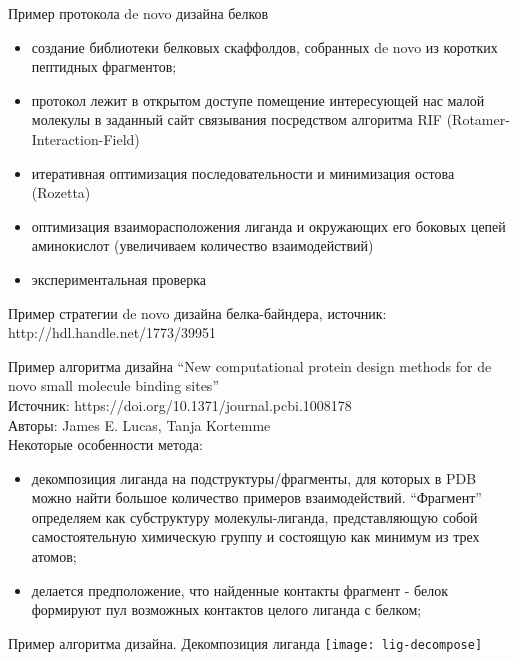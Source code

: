 \begin{frame}{Пример протокола de novo дизайна белков}
    \begin{itemize}
        \item   создание библиотеки белковых
        скаффолдов, собранных de novo из
        коротких пептидных фрагментов;
        \item   протокол лежит в открытом доступе
      помещение интересующей нас
        малой молекулы в заданный сайт
        связывания посредством
        алгоритма RIF
        (Rotamer-Interaction-Field)
        \item итеративная оптимизация
        последовательности и
        минимизация остова (Rozetta)
        \item   оптимизация взаиморасположения
        лиганда и окружающих его боковых   
        цепей аминокислот (увеличиваем    
        количество взаимодействий)
   \item  экспериментальная проверка   
    \end{itemize}
    Пример стратегии de novo дизайна белка-байндера,  источник: http://hdl.handle.net/1773/39951
\end{frame}


\begin{frame}{Пример алгоритма дизайна}
    “New computational protein design methods for de novo small molecule binding sites”\\
Источник: https://doi.org/10.1371/journal.pcbi.1008178\\
Авторы: James E. Lucas, Tanja Kortemme\\
Некоторые особенности метода:
\begin{itemize}
    \item   декомпозиция лиганда на подструктуры/фрагменты, для которых в PDB можно
    найти большое количество примеров взаимодействий.
    “Фрагмент” определяем как субструктуру молекулы-лиганда, представляющую
    собой самостоятельную химическую группу и состоящую как минимум из трех
    атомов;
    \item  делается предположение, что найденные контакты фрагмент - белок
    формируют пул возможных контактов целого лиганда с белком;
\end{itemize}
\end{frame}

\begin{frame}{Пример алгоритма дизайна. Декомпозиция лиганда}
    \texttt{[image: lig-decompose]}
\end{frame}    

